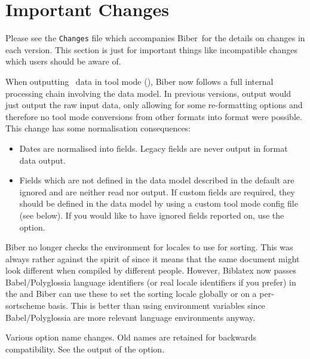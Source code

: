 \documentclass{ltxdockit}
\newcommand*{\biber}{Biber\xspace}
\newcommand*{\biblatex}{Biblatex\xspace}
\begin{document}
\printtitlepage
\tableofcontents

\section{Important Changes}\label{special}

Please see the \verb+Changes+ file which accompanies \biber\ for the
details on changes in each version. This section is just for important
things like incompatible changes which users should be aware of.

When outputting \bibtex\ data in tool mode (), \biber now
follows a full internal processing chain involving the data model. In
previous versions, \bibtex output would just output the raw
\bibtex input data, only allowing for some re-formatting options and
therefore no tool mode conversions from other formats into \bibtex format
were possible. This change has some normalisation consequences:

\begin{itemize}
\item Dates are normalised into  fields. Legacy
   fields are never output in \bibtex format data output.
\item Fields which are not defined in the data model described in the
  default  are ignored and are neither read nor
  output. If custom fields are required, they should be defined in the data
  model by using a custom tool mode config file (see below). If you would
  like to have ignored fields reported on, use the
   option.
\end{itemize}

\biber no longer checks the environment for locales to use for sorting. This
was always rather against the spirit of \tex since it means that the same
document might look different when compiled by different people. However,
\biblatex now passes Babel/Polyglossia language identifiers (or real locale
identifiers if you prefer) in the  and \biber can use these to
set the sorting locale globally or on a per-sortscheme basis. This is better
than using environment variables since Babel/Polyglossia are more \latex
relevant language environments anyway.

Various option name changes. Old names are retained for backwards
compatibility. See the output of the  option.
\end{document}
